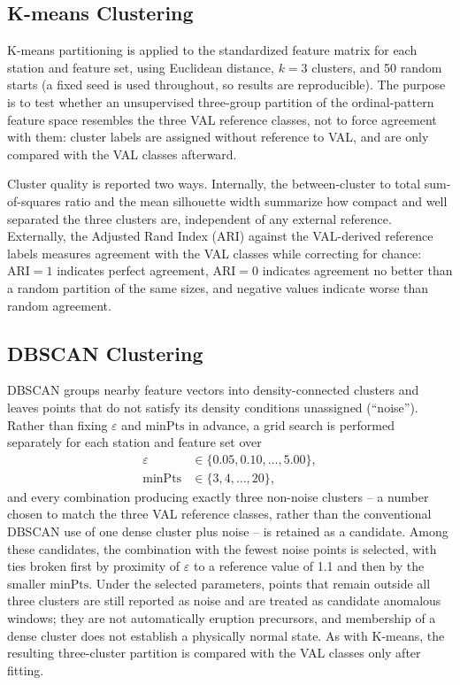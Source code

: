 \documentclass[11pt,a4paper]{article}
\begin{document}
\subsection{K-means Clustering}\label{sec:methods-kmeans}

K-means partitioning is applied to the standardized feature matrix for each station and feature set, using Euclidean distance, $k=3$ clusters, and 50 random starts (a fixed seed is used throughout, so results are reproducible). The purpose is to test whether an unsupervised three-group partition of the ordinal-pattern feature space resembles the three VAL reference classes, not to force agreement with them: cluster labels are assigned without reference to VAL, and are only compared with the VAL classes afterward.

Cluster quality is reported two ways. Internally, the between-cluster to total sum-of-squares ratio and the mean silhouette width summarize how compact and well separated the three clusters are, independent of any external reference. Externally, the Adjusted Rand Index (ARI) against the VAL-derived reference labels measures agreement with the VAL classes while correcting for chance: $\mathrm{ARI}=1$ indicates perfect agreement, $\mathrm{ARI}=0$ indicates agreement no better than a random partition of the same sizes, and negative values indicate worse than random agreement.

\subsection{DBSCAN Clustering}\label{sec:methods-dbscan}

DBSCAN groups nearby feature vectors into density-connected clusters and leaves points that do not satisfy its density conditions unassigned (``noise''). Rather than fixing $\varepsilon$ and $\mathrm{minPts}$ in advance, a grid search is performed separately for each station and feature set over
\begin{align*}
	\varepsilon &\in \{0.05, 0.10, \ldots, 5.00\}, \\
	\mathrm{minPts} &\in \{3, 4, \ldots, 20\},
\end{align*}
and every combination producing exactly three non-noise clusters -- a number chosen to match the three VAL reference classes, rather than the conventional DBSCAN use of one dense cluster plus noise -- is retained as a candidate. Among these candidates, the combination with the fewest noise points is selected, with ties broken first by proximity of $\varepsilon$ to a reference value of 1.1 and then by the smaller $\mathrm{minPts}$. Under the selected parameters, points that remain outside all three clusters are still reported as noise and are treated as candidate anomalous windows; they are not automatically eruption precursors, and membership of a dense cluster does not establish a physically normal state. As with K-means, the resulting three-cluster partition is compared with the VAL classes only after fitting.
\end{document}
